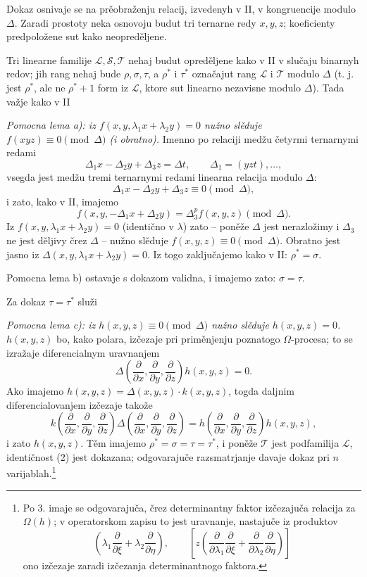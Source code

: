 \documentclass[11pt]{article}
\begin{document}
Dokaz osnivaje se na prěobraženju relacij, izvedenyh v II, v kongruencije modulo $\Delta$. Zaradi prostoty neka osnovoju budut tri ternarne redy $x,y,z$; koeficienty predpoložene sut kako neopreděljene.

Tri linearne familije $\mathcal L,\mathcal S,\mathcal T$ nehaj budut opreděljene kako v II v slučaju binarnyh redov; jih rang nehaj bude $\rho,\sigma,\tau$, a $\rho^*$ i $\tau^*$ označajut rang $\mathcal L$ i $\mathcal T$ modulo $\Delta$ (t. j. jest $\rho^*$, ale ne $\rho^*+1$ form iz $\mathcal L$, ktore sut linearno nezavisne modulo $\Delta$). Tada važje kako v II

{\itshape Pomocna lema a): iz $f(x,y,\lambda_1x+\lambda_2y)=0$ nužno slěduje $f(xyz)\equiv0\pmod{\Delta}$ (i obratno).} Imenno po relaciji medžu četyrmi ternarnymi redami
\[
  \Delta_1x-\Delta_2y+\Delta_3z=\Delta t,
  \qquad \Delta_1=(yzt),\ldots,
\]
vsegda jest medžu tremi ternarnymi redami linearna relacija modulo $\Delta$:
\[
  \Delta_1x-\Delta_2y+\Delta_3z\equiv0\pmod{\Delta},
\]
i zato, kako v II, imajemo
\[
  f(x,y,-\Delta_1x+\Delta_2y)=\Delta_3^p f(x,y,z)\pmod{\Delta}.
\]
Iz $f(x,y,\lambda_1x+\lambda_2y)=0$ (identično v $\lambda$) zato -- poněže $\Delta$ jest nerazložimy i $\Delta_3$ ne jest děljivy črez $\Delta$ -- nužno slěduje $f(x,y,z)\equiv0\pmod{\Delta}$. Obratno jest jasno iz $\Delta(x,y,\lambda_1x+\lambda_2y)=0$. Iz togo zaključajemo kako v II: $\rho^*=\sigma$.

Pomocna lema b) ostavaje s dokazom validna, i imajemo zato: $\sigma=\tau$.

Za dokaz $\tau=\tau^*$ služi

{\itshape Pomocna lema c): iz $h(x,y,z)\equiv0\pmod{\Delta}$ nužno slěduje $h(x,y,z)=0$.}
$h(x,y,z)$ bo, kako polara, izčezaje pri priměnjenju poznatogo $\Omega$-procesa; to se izražaje diferencialnym uravnanjem
\[
  \Delta\!\left(\frac{\partial}{\partial x},\frac{\partial}{\partial y},\frac{\partial}{\partial z}\right)h(x,y,z)=0.
\]
Ako imajemo $h(x,y,z)=\Delta(x,y,z)\cdot k(x,y,z)$, togda daljnim diferencialovanjem izčezaje takože
\[
  k\!\left(\frac{\partial}{\partial x},\frac{\partial}{\partial y},\frac{\partial}{\partial z}\right)
  \Delta\!\left(\frac{\partial}{\partial x},\frac{\partial}{\partial y},\frac{\partial}{\partial z}\right)
  =
  h\!\left(\frac{\partial}{\partial x},\frac{\partial}{\partial y},\frac{\partial}{\partial z}\right)h(x,y,z),
\]
i zato $h(x,y,z)$. Těm imajemo $\rho^*=\sigma=\tau=\tau^*$, i poněže $\mathcal T$ jest podfamilija $\mathcal L$, identičnost (2) jest dokazana; odgovarajuče razsmatrjanje davaje dokaz pri $n$ varijablah.\footnote{Po 3. imaje se odgovarajuča, črez determinantny faktor izčezajuča relacija za $\Omega(h)$; v operatorskom zapisu to jest uravnanje, nastajuče iz produktov
\[
 \left(\lambda_1\frac{\partial}{\partial \xi}+\lambda_2\frac{\partial}{\partial \eta}\right),
 \qquad
 \left[z\left(\frac{\partial}{\partial\lambda_1}\frac{\partial}{\partial \xi}
 +\frac{\partial}{\partial\lambda_2}\frac{\partial}{\partial \eta}\right)\right]
\]
ono izčezaje zaradi izčezanja determinantnogo faktora.}
\end{document}
